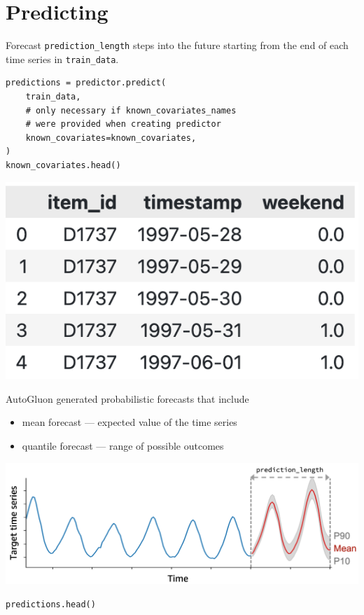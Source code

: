 \vfill\null
\columnbreak

\section*{Predicting}
Forecast \texttt{prediction\_length} steps into the future starting from the end of each time series in \texttt{train\_data}.
\begin{verbatim}
predictions = predictor.predict(
    train_data,
    # only necessary if known_covariates_names
    # were provided when creating predictor
    known_covariates=known_covariates,
)
known_covariates.head()
\end{verbatim}
\vspace{-5mm}
\begin{center}
\includegraphics[width=0.35\linewidth]{timeseries/images/future_known_covariates.png}
\end{center}

\medskip

AutoGluon generated probabilistic forecasts that include
\begin{itemize}
    \item mean forecast --- expected value of the time series
    \item quantile forecast --- range of possible outcomes
\end{itemize}

\begin{center}
\includegraphics[width=0.95\linewidth]{timeseries/images/probabilistic_forecast.png}
\end{center}

\begin{verbatim}
predictions.head()
\end{verbatim}

